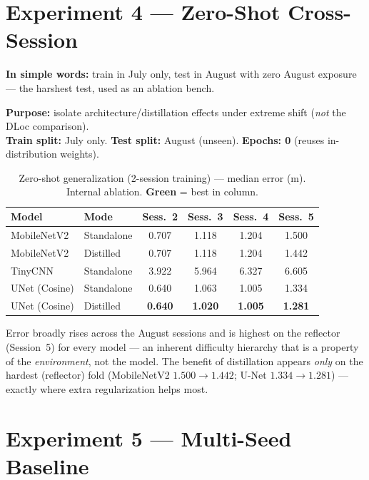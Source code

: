 \documentclass[11pt]{article}
\newcommand{\best}[1]{\textbf{\textcolor{green!50!black}{#1}}}
\begin{document}
\section{Experiment 4 --- Zero-Shot Cross-Session}

\textbf{In simple words:} train in July only, test in August with zero August exposure --- the harshest
test, used as an ablation bench.

\textbf{Purpose:} isolate architecture/distillation effects under extreme shift (\emph{not} the DLoc
comparison).\\
\textbf{Train split:} July only. \quad \textbf{Test split:} August (unseen). \quad \textbf{Epochs: 0}
(reuses in-distribution weights).

\begin{table}[h]\centering\footnotesize
\caption{Zero-shot generalization (2-session training) --- median error (m). Internal ablation.
\best{Green} = best in column.}
\begin{tabular}{@{}llcccc@{}}
\toprule
\textbf{Model} & \textbf{Mode} & \textbf{Sess.~2} & \textbf{Sess.~3} & \textbf{Sess.~4} & \textbf{Sess.~5} \\
\midrule
MobileNetV2   & Standalone & 0.707 & 1.118 & 1.204 & 1.500 \\
MobileNetV2   & Distilled  & 0.707 & 1.118 & 1.204 & 1.442 \\
TinyCNN       & Standalone & 3.922 & 5.964 & 6.327 & 6.605 \\
UNet (Cosine) & Standalone & 0.640 & 1.063 & 1.005 & 1.334 \\
UNet (Cosine) & Distilled  & \best{0.640} & \best{1.020} & \best{1.005} & \best{1.281} \\
\bottomrule
\end{tabular}
\end{table}

\begin{whybox}
Error broadly rises across the August sessions and is highest on the reflector (Session~5) for every model
--- an inherent difficulty hierarchy that is a property of the \emph{environment}, not the model. The
benefit of distillation appears \emph{only} on the hardest (reflector) fold (MobileNetV2 $1.500\to1.442$;
U-Net $1.334\to1.281$) --- exactly where extra regularization helps most.
\end{whybox}

\section{Experiment 5 --- Multi-Seed Baseline}
\end{document}

